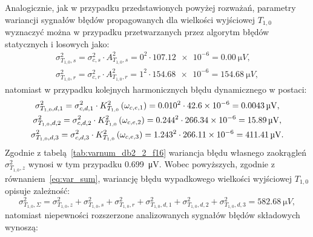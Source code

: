 Analogicznie, jak w przypadku przedstawionych powyżej rozważań, parametry wariancji sygnałów błędów propagowanych dla wielkości wyjściowej $T_{1,0}$ wyznaczyć można w przypadku przetwarzanych przez algorytm błędów statycznych i losowych jako:
\begin{gather}
\sigma_{T_{1,0},s}^{2} = \sigma_{c,s}^{2} \cdot A_{T_{1,0},s}^{2} = 0^{2} \cdot \num{107.12e-6} = \qty{0.00}{\micro V} \label{eq:sym_partd_output_var_stat_T_1_0}, \\
\sigma_{T_{1,0},r}^{2} = \sigma_{c,r}^{2} \cdot A_{T_{1,0},r}^{2} = 1^{2} \cdot \num{154.68e-6} = \qty{154.68}{\micro V} \label{eq:sym_partd_output_var_rand_T_1_0},
\end{gather}
natomiast w przypadku kolejnych harmonicznych błędu dynamicznego w postaci: 
\begin{gather}
\sigma_{T_{1,0},d,1}^{2} = \sigma_{c,d,1}^{2} \cdot K_{T_{1,0}}^{2} \left(\omega_{c,e,1}\right) = {0.010}^{2} \cdot \num{42.6e-6} = \qty{0.0043}{\micro V} \label{eq:sym_partd_output_var_dyn_1_T_1_0}, \\
\sigma_{T_{1,0},d,2}^{2} = \sigma_{c,d,2}^{2} \cdot K_{T_{1,0}}^{2} \left(\omega_{c,e,2}\right) = {0.244}^{2} \cdot \num{266.34e-6} = \qty{15.89}{\micro V} \label{eq:sym_partd_output_var_dyn_2_T_1_0}, \\
\sigma_{T_{1,0},d,3}^{2} = \sigma_{c,d,3}^{2} \cdot K_{T_{1,0}}^{2} \left(\omega_{c,e,3}\right) = {1.243}^{2} \cdot \num{266.11e-6} = \qty{411.41}{\micro V} \label{eq:sym_partd_output_var_dyn_3_T_1_0}.
\end{gather}
Zgodnie z tabelą~\ref{tab:varnum_db2_2_f16} wariancja błędu własnego zaokrągleń $\sigma_{T_{1,0},z}^{2}$ wynosi w tym przypadku \qty{0.699}{\micro V}. Wobec powyższych, zgodnie z równaniem~\eqref{eq:var_sum}, wariancję błędu wypadkowego wielkości wyjściowej $T_{1,0}$ opisuje zależność:
\begin{equation}
\sigma_{T_{1,0},\Sigma}^{2} = \sigma_{T_{1,0},z}^{2} + \sigma_{T_{1,0},s}^{2} + \sigma_{T_{1,0},r}^{2} + \sigma_{T_{1,0},d,1}^{2} + \sigma_{T_{1,0},d,2}^{2} + \sigma_{T_{1,0},d,3}^{2} = \qty{582.68}{\micro V} \label{eq:sym_partd_output_var_sum_T_1_0},
\end{equation}
natomiast niepewności rozszerzone analizowanych sygnałów błędów składowych wynoszą:
